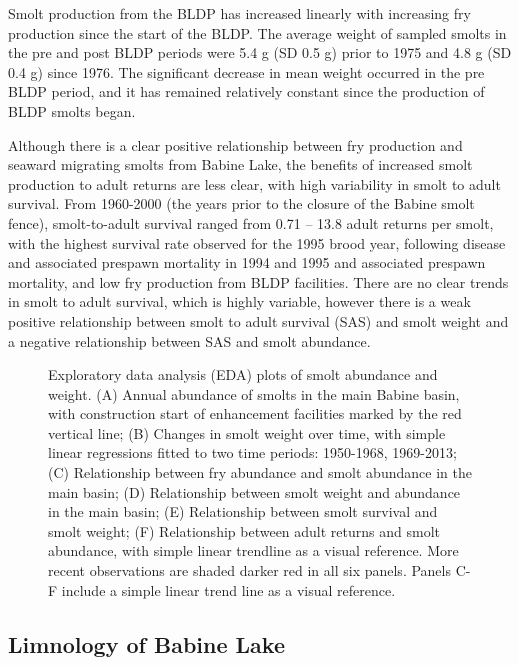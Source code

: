 \documentclass[french,11pt]{book}
\begin{document}
Smolt production from the BLDP has increased linearly with increasing fry production since the start of the BLDP. The average weight of sampled smolts in the pre and post BLDP periods were 5.4 g (SD 0.5 g) prior to 1975 and 4.8 g (SD 0.4 g) since 1976. The significant decrease in mean weight occurred in the pre BLDP period, and it has remained relatively constant since the production of BLDP smolts began.

Although there is a clear positive relationship between fry production and seaward migrating smolts from Babine Lake, the benefits of increased smolt production to adult returns are less clear, with high variability in smolt to adult survival. From 1960-2000 (the years prior to the closure of the Babine smolt fence), smolt-to-adult survival ranged from 0.71 -- 13.8 adult returns per smolt, with the highest survival rate observed for the 1995 brood year, following disease and associated prespawn mortality in 1994 and 1995 and associated prespawn mortality, and low fry production from BLDP facilities. There are no clear trends in smolt to adult survival, which is highly variable, however there is a weak positive relationship between smolt to adult survival (SAS) and smolt weight and a negative relationship between SAS and smolt abundance.


\begin{figure}[htb]

{\centering {} 

}

\caption{Exploratory data analysis (EDA) plots of smolt abundance and weight. (A) Annual abundance of smolts in the main Babine basin, with construction start of enhancement facilities marked by the red vertical line; (B) Changes in smolt weight over time, with simple linear regressions fitted to two time periods: 1950-1968, 1969-2013; (C) Relationship between fry abundance and smolt abundance in the main basin; (D) Relationship between smolt weight and abundance in the main basin; (E) Relationship between smolt survival and smolt weight; (F) Relationship between adult returns and smolt abundance, with simple linear trendline as a visual reference. More recent observations are shaded darker red in all six panels. Panels C-F include a simple linear trend line as a visual reference.}\label{fig:SmoltPlots}
\end{figure}
\subsection{Limnology of Babine Lake}\label{limnology-of-babine-lake}
\end{document}
